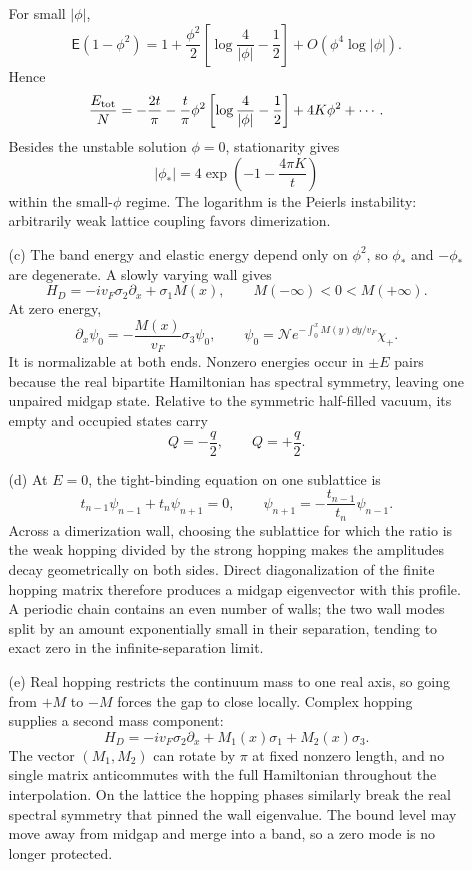 \begin{enumerate}
\begin{enumerate}
      For small \(|\phi|\),
      \[
        \mathsf E(1-\phi^2)
          =1+\frac{\phi^2}{2}
            \left[\log\frac4{|\phi|}-\frac12\right]
            +O(\phi^4\log|\phi|).
      \]
      Hence
      \[
        \frac{E_{\rm tot}}N
          =-\frac{2t}{\pi}
           -\frac{t}{\pi}\phi^2
             \left[\log\frac4{|\phi|}-\frac12\right]
           +4K\phi^2+\cdots .
      \]
      Besides the unstable solution \(\phi=0\), stationarity gives
      \[
        \boxed{|\phi_*|
          =4\exp\left(-1-\frac{4\pi K}{t}\right)}
      \]
      within the small-\(\phi\) regime.  The logarithm is the Peierls
      instability: arbitrarily weak lattice coupling favors dimerization.
    \item[(c)] The band energy and elastic energy depend only on
      \(\phi^2\), so \(\phi_*\) and \(-\phi_*\) are degenerate.  A slowly
      varying wall gives
      \[
        H_D=-iv_F\sigma_2\partial_x+\sigma_1M(x),
        \qquad M(-\infty)<0<M(+\infty).
      \]
      At zero energy,
      \[
        \partial_x\psi_0
          =-\frac{M(x)}{v_F}\sigma_3\psi_0,
        \qquad
        \psi_0=\mathcal N
          e^{-\int_0^xM(y)\dd y/v_F}\chi_+ .
      \]
      It is normalizable at both ends.  Nonzero energies occur in
      \(\pm E\) pairs because the real bipartite Hamiltonian has spectral
      symmetry, leaving one unpaired midgap state.  Relative to the
      symmetric half-filled vacuum, its empty and occupied states carry
      \[
        \boxed{Q=-\frac q2,\qquad Q=+\frac q2}.
      \]
    \item[(d)] At \(E=0\), the tight-binding equation on one sublattice is
      \[
        t_{n-1}\psi_{n-1}+t_n\psi_{n+1}=0,
        \qquad
        \psi_{n+1}=-\frac{t_{n-1}}{t_n}\psi_{n-1}.
      \]
      Across a dimerization wall, choosing the sublattice for which the
      ratio is the weak hopping divided by the strong hopping makes the
      amplitudes decay geometrically on both sides.  Direct diagonalization
      of the finite hopping matrix therefore produces a midgap eigenvector
      with this profile.  A periodic chain contains an even number of
      walls; the two wall modes split by an amount exponentially small in
      their separation, tending to exact zero in the infinite-separation
      limit.
    \item[(e)] Real hopping restricts the continuum mass to one real axis,
      so going from \(+M\) to \(-M\) forces the gap to close locally.
      Complex hopping supplies a second mass component:
      \[
        H_D=-iv_F\sigma_2\partial_x
          +M_1(x)\sigma_1+M_2(x)\sigma_3 .
      \]
      The vector \((M_1,M_2)\) can rotate by \(\pi\) at fixed nonzero
      length, and no single matrix anticommutes with the full Hamiltonian
      throughout the interpolation.  On the lattice the hopping phases
      similarly break the real spectral symmetry that pinned the wall
      eigenvalue.  The bound level may move away from midgap and merge into
      a band, so a zero mode is no longer protected.
  \end{enumerate}


\end{enumerate}
